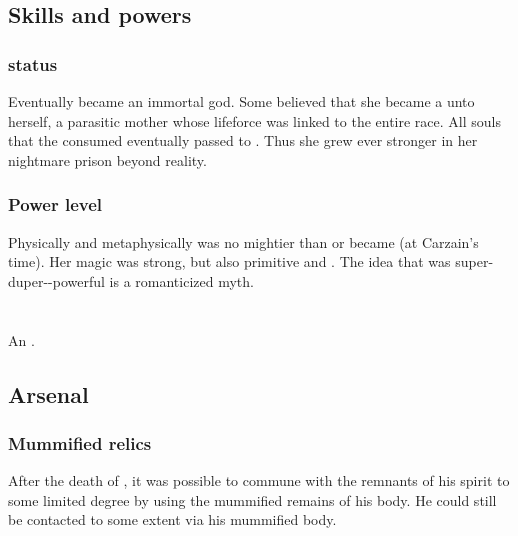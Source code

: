 \subsection{Skills and powers}





\subsubsection{\Dweomer status}
Eventually \Tiamat became an immortal god. 
Some believed that she became a \dweomer unto herself, a parasitic mother whose lifeforce was linked to the entire \draconian race. 
All souls that the \dragons consumed eventually passed to \Tiamat.
Thus she grew ever stronger in her nightmare prison beyond reality. 





\subsubsection{Power level}
Physically and metaphysically \Kserasshana{} was no mightier than \Secherdamon{} or \Ishnaruchaefir{} became (at Carzain's time). 
Her magic was strong, but also primitive and \naive. 
The idea that \Kserasshana{} was super-duper-\uber-powerful is a romanticized myth. 















\section{\ValcanSethicus}
\index{\Sethicus}
An \ophidian. 









\subsection{Arsenal}





\subsubsection{Mummified relics}
After the death of \Sethicus, it was possible to commune with the remnants of his spirit to some limited degree by using the mummified remains of his body. 
He could still be contacted to some extent via his mummified body.






